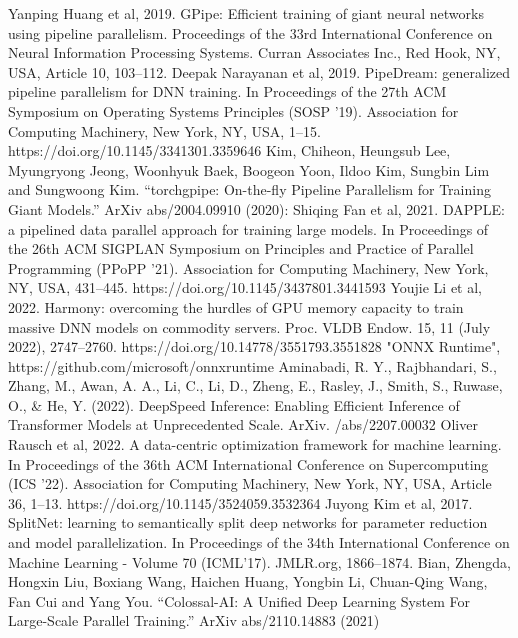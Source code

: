 \documentclass[conference]{IEEEtran}
\begin{document}
\begin{thebibliography}{00}
 Yanping Huang et al, 2019. GPipe: Efficient training of giant neural networks using pipeline parallelism. Proceedings of the 33rd International Conference on Neural Information Processing Systems. Curran Associates Inc., Red Hook, NY, USA, Article 10, 103–112.
 Deepak Narayanan et al, 2019. PipeDream: generalized pipeline parallelism for DNN training. In Proceedings of the 27th ACM Symposium on Operating Systems Principles (SOSP '19). Association for Computing Machinery, New York, NY, USA, 1–15. https://doi.org/10.1145/3341301.3359646
 Kim, Chiheon, Heungsub Lee, Myungryong Jeong, Woonhyuk Baek, Boogeon Yoon, Ildoo Kim, Sungbin Lim and Sungwoong Kim. “torchgpipe: On-the-fly Pipeline Parallelism for Training Giant Models.” ArXiv abs/2004.09910 (2020): 
 Shiqing Fan et al, 2021. DAPPLE: a pipelined data parallel approach for training large models. In Proceedings of the 26th ACM SIGPLAN Symposium on Principles and Practice of Parallel Programming (PPoPP '21). Association for Computing Machinery, New York, NY, USA, 431–445. https://doi.org/10.1145/3437801.3441593
 Youjie Li et al, 2022. Harmony: overcoming the hurdles of GPU memory capacity to train massive DNN models on commodity servers. Proc. VLDB Endow. 15, 11 (July 2022), 2747–2760. https://doi.org/10.14778/3551793.3551828
 "ONNX Runtime", https://github.com/microsoft/onnxruntime
 Aminabadi, R. Y., Rajbhandari, S., Zhang, M., Awan, A. A., Li, C., Li, D., Zheng, E., Rasley, J., Smith, S., Ruwase, O., \& He, Y. (2022). DeepSpeed Inference: Enabling Efficient Inference of Transformer Models at Unprecedented Scale. ArXiv. /abs/2207.00032
 Oliver Rausch et al, 2022. A data-centric optimization framework for machine learning. In Proceedings of the 36th ACM International Conference on Supercomputing (ICS '22). Association for Computing Machinery, New York, NY, USA, Article 36, 1–13. https://doi.org/10.1145/3524059.3532364
 Juyong Kim et al, 2017. SplitNet: learning to semantically split deep networks for parameter reduction and model parallelization. In Proceedings of the 34th International Conference on Machine Learning - Volume 70 (ICML'17). JMLR.org, 1866–1874.
 Bian, Zhengda, Hongxin Liu, Boxiang Wang, Haichen Huang, Yongbin Li, Chuan-Qing Wang, Fan Cui and Yang You. “Colossal-AI: A Unified Deep Learning System For Large-Scale Parallel Training.” ArXiv abs/2110.14883 (2021)

\end{thebibliography} 
\end{document}
